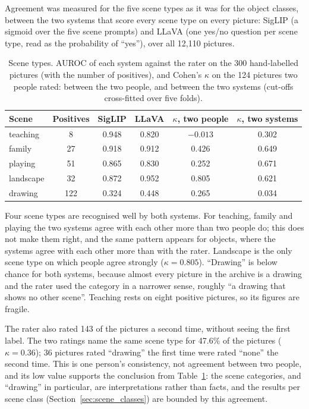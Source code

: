 Agreement was measured for the five scene types as it was for the object classes, between the two systems that score every scene type on every picture: SigLIP (a sigmoid over the five scene prompts) and LLaVA (one yes/no question per scene type, read as the probability of ``yes''), over all 12,110 pictures.

\begin{table}[!htbp]
\centering
\caption[Scene types: systems and people]{Scene types. AUROC of each system against the rater on the 300 hand-labelled pictures (with the number of positives), and Cohen's $\kappa$ on the 124 pictures two people rated: between the two people, and between the two systems (cut-offs cross-fitted over five folds).}
\label{tab:scene_agreement}
\begin{tabular}{lccccc}
\toprule
Scene & Positives & SigLIP & LLaVA & $\kappa$, two people & $\kappa$, two systems \\
\midrule
teaching & 8 & 0.948 & 0.820 & $-0.013$ & 0.302 \\
family & 27 & 0.918 & 0.912 & 0.426 & 0.649 \\
playing & 51 & 0.865 & 0.830 & 0.252 & 0.671 \\
landscape & 32 & 0.872 & 0.952 & 0.805 & 0.621 \\
drawing & 122 & 0.324 & 0.448 & 0.265 & 0.034 \\
\bottomrule
\end{tabular}
\end{table}

Four scene types are recognised well by both systems. For teaching, family and playing the two systems agree with each other more than two people do; this does not make them right, and the same pattern appears for objects, where the systems agree with each other more than with the rater. Landscape is the only scene type on which people agree strongly ($\kappa = 0.805$). ``Drawing'' is below chance for both systems, because almost every picture in the archive is a drawing and the rater used the category in a narrower sense, roughly ``a drawing that shows no other scene''. Teaching rests on eight positive pictures, so its figures are fragile.

The rater also rated 143 of the pictures a second time, without seeing the first label. The two ratings name the same scene type for 47.6\% of the pictures ($\kappa = 0.36$); 36 pictures rated ``drawing'' the first time were rated ``none'' the second time. This is one person's consistency, not agreement between two people, and its low value supports the conclusion from Table~\ref{tab:scene_agreement}: the scene categories, and ``drawing'' in particular, are interpretations rather than facts, and the results per scene class (Section~\ref{sec:scene_classes}) are bounded by this agreement.

